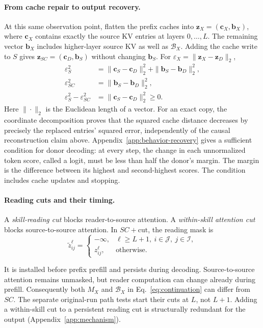 \paragraph{From cache repair to output recovery.}
At this same observation point, flatten the prefix caches into
$\mathbf z_X=(\mathbf c_X,\mathbf b_X)$, where $\mathbf c_X$ contains
exactly the source KV entries at layers $0,\ldots,L$.
The remaining vector $\mathbf b_X$ includes higher-layer source KV as well as
$\mathcal B_X$. Adding the cache write to $S$ gives
$\mathbf z_{SC}=(\mathbf c_D,\mathbf b_S)$ without changing
$\mathbf b_S$. For $\varepsilon_X=\|\mathbf z_X-\mathbf z_D\|_2$,
\begin{equation}
\begin{aligned}
\varepsilon_S^2
 &=\|\mathbf c_S-\mathbf c_D\|_2^2+\|\mathbf b_S-\mathbf b_D\|_2^2,\\
\varepsilon_{SC}^2&=\|\mathbf b_S-\mathbf b_D\|_2^2,\\
\varepsilon_S^2-\varepsilon_{SC}^2
 &=\|\mathbf c_S-\mathbf c_D\|_2^2\ge0.
\end{aligned}
\label{eq:cache-distance}
\end{equation}
Here $\|\cdot\|_2$ is the Euclidean length of a vector.
For an exact copy, the coordinate decomposition proves that the squared
cache distance decreases by precisely the replaced entries' squared error,
independently of the causal reconstruction claim above.
Appendix~\ref{app:behavior-recovery} gives a sufficient condition for
donor decoding: at every step, the change in each unnormalized token score,
called a logit, must be less than half the donor's margin. The margin is
the difference between its highest and second-highest scores.
The condition includes cache updates and stopping.

\begin{samepage}
\paragraph{Reading cuts and their timing.}
A \emph{skill-reading cut} blocks reader-to-source attention.
A \emph{within-skill attention cut} blocks source-to-source attention.
In $SC+\mathrm{cut}$, the reading mask is
\begin{equation}
\widetilde z^\ell_{ij}=
\begin{cases}
-\infty,&\ell\ge L+1,\ i\in\mathcal J,\ j\in\mathcal I,\\
z^\ell_{ij},&\text{otherwise}.
\end{cases}
\label{eq:reading-cut}
\end{equation}
\end{samepage}
It is installed before prefix prefill and persists during decoding.
Source-to-source attention remains unmasked, but reader computation can
change already during prefill. Consequently both $M_X$ and
$\mathcal B_X$ in Eq.~\eqref{eq:continuation} can differ from $SC$.
The separate original-run path tests start their cuts at $L$, not $L+1$.
Adding a within-skill cut to a persistent reading cut is structurally
redundant for the output (Appendix~\ref{app:mechanism}).

